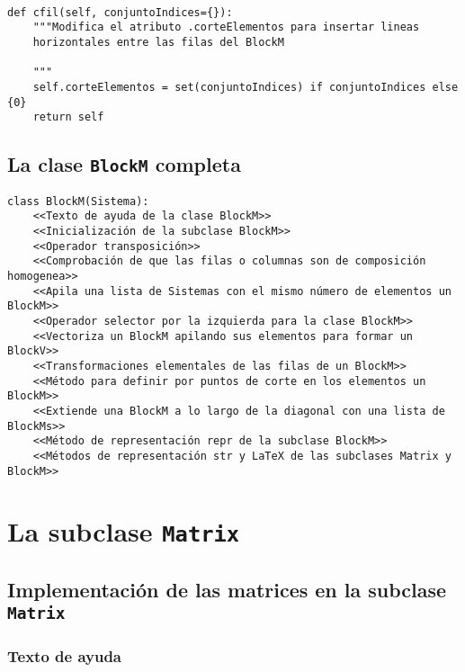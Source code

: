 \documentclass[11pt]{report}
\begin{document}
\begin{verbatim}

def cfil(self, conjuntoIndices={}):
    """Modifica el atributo .corteElementos para insertar lineas
    horizontales entre las filas del BlockM

    """
    self.corteElementos = set(conjuntoIndices) if conjuntoIndices else {0}
    return self

\end{verbatim}


\clearpage

\section{La clase \texttt{BlockM} completa}
\label{sec:org51c8ad2}

\begin{verbatim}
class BlockM(Sistema):
    <<Texto de ayuda de la clase BlockM>>
    <<Inicialización de la subclase BlockM>>
    <<Operador transposición>>
    <<Comprobación de que las filas o columnas son de composición homogenea>>
    <<Apila una lista de Sistemas con el mismo número de elementos un BlockM>>
    <<Operador selector por la izquierda para la clase BlockM>>
    <<Vectoriza un BlockM apilando sus elementos para formar un BlockV>>
    <<Transformaciones elementales de las filas de un BlockM>>
    <<Método para definir por puntos de corte en los elementos un BlockM>>
    <<Extiende una BlockM a lo largo de la diagonal con una lista de BlockMs>>
    <<Método de representación repr de la subclase BlockM>>
    <<Métodos de representación str y LaTeX de las subclases Matrix y BlockM>>
\end{verbatim}


\chapter{La subclase \texttt{Matrix}}
\label{sec:orgc036706}

\section{Implementación de las matrices en la subclase \texttt{Matrix}}
\label{sec:orgb0ba86c}

\subsection{Texto de ayuda}
\label{sec:org2f12e13}
\end{document}
